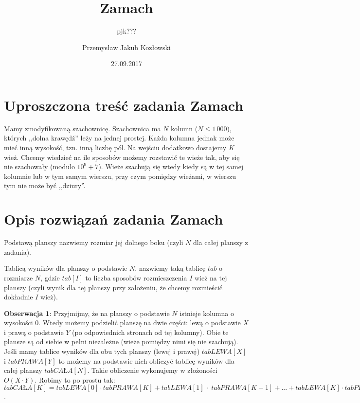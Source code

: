\documentclass[opr,utf8]{sinol}
\newcounter{def}
\newcounter{tw}
\newcounter{wn}
\newcounter{obs}
\begin{document}
 \signature{pjk???}
  \title{Zamach}
  \author{Przemysław Jakub Kozłowski}
  \date{27.09.2017}



\begin{tasktext}%

\setcounter{def}{1}
\setcounter{tw}{1}
\setcounter{wn}{1}
\setcounter{obs}{1}

\section{Uproszczona treść zadania Zamach}

Mamy zmodyfikowaną szachownicę. Szachownica ma $N$ kolumn ($N \leq 1\,000$), których ,,dolna krawędź'' leży na jednej prostej. Każda kolumna jednak może mieć inną wysokość, tzn. inną liczbę pól. Na wejściu dodatkowo dostajemy $K$ wież. Chcemy wiedzieć na ile sposobów możemy rozstawić te wieże tak, aby się nie szachowały (modulo $10^9+7$). Wieże szachują się wtedy kiedy są w tej samej kolumnie lub w tym samym wierszu, przy czym pomiędzy wieżami, w wierszu tym nie może być ,,dziury''.

\section{Opis rozwiązań zadania Zamach}

Podstawą planszy nazwiemy rozmiar jej dolnego boku (czyli $N$ dla całej planszy z zadania).

Tablicą wyników dla planszy o podstawie $N$, nazwiemy taką tablicę $tab$ o rozmiarze $N$, gdzie $tab[I]$ to liczba sposobów rozmieszczenia $I$ wież na tej planszy (czyli wynik dla tej planszy przy założeniu, że chcemy rozmieścić dokładnie $I$ wież).

\textbf{Obserwacja 1}: Przyjmijmy, że na planszy o podstawie $N$ istnieje kolumna o wysokości $0$. Wtedy możemy podzielić planszę na dwie części: lewą o podstawie $X$ i prawą o podstawie $Y$ (po odpowiednich stronach od tej kolumny). Obie te plansze są od siebie w pełni niezależne (wieże pomiędzy nimi się nie szachują). Jeśli mamy tablice wyników dla obu tych planszy (lewej i prawej) $tabLEWA[X]$ i $tabPRAWA[Y]$ to możemy na podstawie nich obliczyć tablicę wyników dla całej planszy $tabCAŁA[N]$. Takie obliczenie wykonujemy w złożoności $O(X \cdot Y)$. Robimy to po prostu tak: $tabCAŁA[K] = tabLEWA[0] \cdot tabPRAWA[K] + tabLEWA[1]~\cdot~ tabPRAWA[K-1] + ... + tabLEWA[K] \cdot tabPRAWA[0]$.


\end{tasktext}
\end{document}
